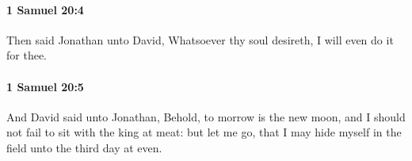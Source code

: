 		\paragraph{1 Samuel 20:4} %
			\label{1SAMUEL-20-4}

			Then said Jonathan unto David, Whatsoever thy soul desireth, I will even do it for thee.


		\paragraph{1 Samuel 20:5} %
			\label{1SAMUEL-20-5}

			And David said unto Jonathan, Behold, to morrow is the new moon, and I should not fail to sit with the king at meat: but let me go, that I may hide myself in the field unto the third day at even.


